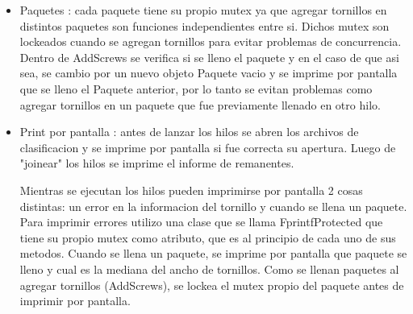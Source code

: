 \documentclass[a4paper,12pt]{report}
\begin{document}
\begin{itemize}

\item Paquetes : cada paquete tiene su propio mutex ya que agregar tornillos en distintos paquetes son funciones independientes entre si. Dichos mutex son lockeados cuando se agregan tornillos para evitar problemas de concurrencia. Dentro de AddScrews se verifica si se lleno el paquete y en el caso de que asi sea, se cambio por un nuevo objeto Paquete vacio y se imprime por pantalla que se lleno el Paquete anterior, por lo tanto se evitan problemas como agregar tornillos en un paquete que fue previamente llenado en otro hilo.

\item Print por pantalla : antes de lanzar los hilos se abren los archivos de clasificacion y se imprime por pantalla si fue correcta su apertura. Luego de "joinear" los hilos se imprime el informe de remanentes.

Mientras se ejecutan los hilos pueden imprimirse por pantalla 2 cosas distintas: un error en la informacion del tornillo y cuando se llena un paquete. Para imprimir errores utilizo una clase que se llama FprintfProtected que tiene su propio mutex como atributo, que es al principio de cada uno de sus metodos. Cuando se llena un paquete, se imprime por pantalla que paquete se lleno y cual es la mediana del ancho de tornillos. Como se llenan paquetes al agregar tornillos (AddScrews), se lockea el mutex propio del paquete antes de imprimir por pantalla.  

\end{itemize}
\end{document}
